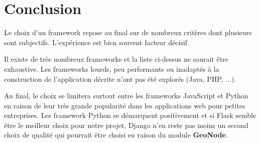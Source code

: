 \documentclass[a4paper, 11pt]{article}
\begin{document}
\section*{Conclusion}

Le choix d'un framework repose au final sur de nombreux critères dont plusieurs sont subjectifs. L'expérience est bien souvent facteur décisif.

Il existe de très nombreux frameworks et la liste ci-dessus ne saurait être exhaustive. Les frameworks lourds, peu performants ou inadaptés à la construction de l'application décrite n'ont pas été explorés (Java, PHP, ...).

Au final, le choix se limitera surtout entre les frameworks JavaScript et Python en raison de leur très grande popularité dans les applications web pour petites entreprises. Les framework Python se démarquent positivement et si Flask semble être le meilleur choix pour notre projet, Django n'en reste pas moins un second choix de qualité qui pourrait être choisi en raison du module \textbf{GeoNode}.
\end{document}
